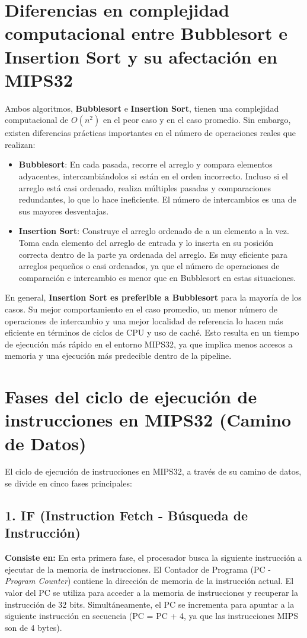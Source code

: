 \documentclass{article}
\begin{document}
\section{Diferencias en complejidad computacional entre Bubblesort e Insertion Sort y su afectación en MIPS32}
Ambos algoritmos, \textbf{Bubblesort} e \textbf{Insertion Sort}, tienen una complejidad computacional de $O(n^2)$ en el peor caso y en el caso promedio. Sin embargo, existen diferencias prácticas importantes en el número de operaciones reales que realizan:

\begin{itemize}
    \item \textbf{Bubblesort}: En cada pasada, recorre el arreglo y compara elementos adyacentes, intercambiándolos si están en el orden incorrecto. Incluso si el arreglo está casi ordenado, realiza múltiples pasadas y comparaciones redundantes, lo que lo hace ineficiente. El número de intercambios es una de sus mayores desventajas.
    \item \textbf{Insertion Sort}: Construye el arreglo ordenado de a un elemento a la vez. Toma cada elemento del arreglo de entrada y lo inserta en su posición correcta dentro de la parte ya ordenada del arreglo. Es muy eficiente para arreglos pequeños o casi ordenados, ya que el número de operaciones de comparación e intercambio es menor que en Bubblesort en estas situaciones.
\end{itemize}
En general, \textbf{Insertion Sort es preferible a Bubblesort} para la mayoría de los casos. Su mejor comportamiento en el caso promedio, un menor número de operaciones de intercambio y una mejor localidad de referencia lo hacen más eficiente en términos de ciclos de CPU y uso de caché. Esto resulta en un tiempo de ejecución más rápido en el entorno MIPS32, ya que implica menos accesos a memoria y una ejecución más predecible dentro de la pipeline.

\section{Fases del ciclo de ejecución de instrucciones en MIPS32 (Camino de Datos)}
El ciclo de ejecución de instrucciones en MIPS32, a través de su camino de datos, se divide en cinco fases principales:

\subsection*{1. IF (Instruction Fetch - Búsqueda de Instrucción)}
\textbf{Consiste en:} En esta primera fase, el procesador busca la siguiente instrucción a ejecutar de la memoria de instrucciones. El Contador de Programa (PC - \textit{Program Counter}) contiene la dirección de memoria de la instrucción actual. El valor del PC se utiliza para acceder a la memoria de instrucciones y recuperar la instrucción de 32 bits. Simultáneamente, el PC se incrementa para apuntar a la siguiente instrucción en secuencia (PC = PC + 4, ya que las instrucciones MIPS son de 4 bytes).
\end{document}
